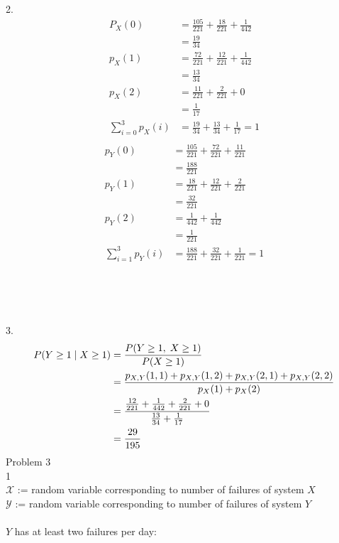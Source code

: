 \documentclass[12pt,border=4pt,multi]{article} %
\begin{document}
2.
\begin{align*}
P_X(0) &= \frac{105}{221} + \frac{18}{221} + \frac{1}{442}\\
&= \boxed{\frac{19}{34}}\\
p_X(1) &= \frac{72}{221} + \frac{12}{221} + \frac{1}{442}\\
&= \boxed{\frac{13}{34}}\\
p_X(2) &= \frac{11}{221} + \frac{2}{221} + 0\\
&= \boxed{\frac{1}{17}}\\
\sum_{i = 0}^3 p_X(i) &= \frac{19}{34} + \frac{13}{34} + \frac{1}{17} = 1\\
\end{align*}
\begin{align*}
p_Y(0) &= \frac{105}{221} + \frac{72}{221} + \frac{11}{221}\\
&= \boxed{\frac{188}{221}}\\
p_Y(1) &= \frac{18}{221} + \frac{12}{221} + \frac{2}{221}\\
&= \boxed{\frac{32}{221}}\\
p_Y(2) &= \frac{1}{442} + \frac{1}{442}\\
&= \boxed{\frac{1}{221}}\\
\sum_{i = 1}^3 p_Y(i) &= \frac{188}{221} + \frac{32}{221} + \frac{1}{221} = 1\\
\end{align*}
\\
\\
\\
\\
3.
\begin{align*}
P(Y \geq 1 \;|\; X \geq 1) &= \frac{P(Y \geq 1,\; X \geq 1)}{P(X \geq 1)}\\
&= \frac{p_{X, Y}(1, 1) + p_{X, Y}(1, 2) + p_{X, Y}(2, 1) + p_{X, Y}(2, 2)}{p_{X}(1) + p_{X}(2)}\\
&= {\large\frac{\frac{12}{221} + \frac{1}{442} + \frac{2}{221} + 0}{\frac{13}{34} + \frac{1}{17}}}\\
&= \frac{29}{195}\\
\end{align*}
\newpage
\noindent
Problem 3\\
1\\
$\mathcal{X}$ := random variable corresponding to number of failures of system $X$\\
$\mathcal{Y}$ := random variable corresponding to number of failures of system $Y$\\
\\
$Y$ has at least two failures per day:
\end{document}
